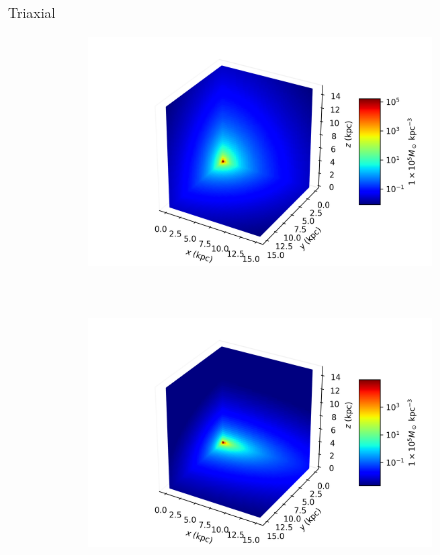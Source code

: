 \documentclass{beamer}
\begin{document}
\begin{frame}{Triaxial}
	\begin{figure}[h]
		\centering
		\begin{subfigure}[t]{0.45\textwidth}
			\includegraphics[width = \textwidth]{"../Files/Week 7/symmetric"}
		\end{subfigure}
		~ 
		\begin{subfigure}[t]{0.45\textwidth}
			\includegraphics[width=\textwidth]{"../Files/Week 7/triaxial"}
		\end{subfigure}
		\begin{subfigure}[t]{0.6\textwidth}

\end{subfigure}
\end{figure}
\end{frame}
\end{document}
